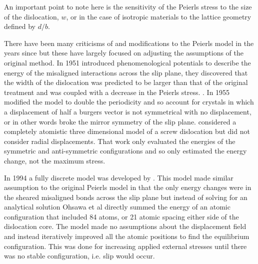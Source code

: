 An important point to note here is the sensitivity of the Peierls stress to the size of the dislocation, $w$, or in the case of isotropic materials to the lattice geometry defined by $d/b$.


There have been many criticisms of and modifications to the Peierls model in the years since but these have largely focused on adjusting the assumptions of the original method.
In 1951 \citet{Foreman1951} introduced phenomenological potentials to describe the energy of the misaligned interactions across the slip plane, they discovered that the width of the dislocation was predicted to be larger than that of the original treatment and was coupled with a decrease in the Peierls stress. .
In 1955 \citet{Huntington1955a} modified the model to double the periodicity and so account for crystals in which a displacement of half a burgers vector is not symmetrical with no displacement, or in other words broke the mirror symmetry of the slip plane. 
\citet{Maradudin1959} considered a completely atomistic three dimensional model of a screw dislocation but did not consider radial displacements. That work only evaluated the energies of the symmetric and anti-symmetric configurations and so only estimated the energy change, not the maximum stress.



In 1994 a fully discrete model was developed by \citet{Ohsawa1994}. This model made similar assumption to the original Peierls model in that the only energy changes were in the sheared misaligned bonds across the slip plane but instead of solving for an analytical solution Ohsawa et al directly summed the energy of an atomic configuration that included 84 atoms, or 21 atomic spacing either side of the dislocation core. The model made no assumptions about the displacement field and instead iteratively improved all the atomic positions to find the equilibrium configuration. This was done for increasing applied external stresses until there was no stable configuration, i.e. slip would occur.



